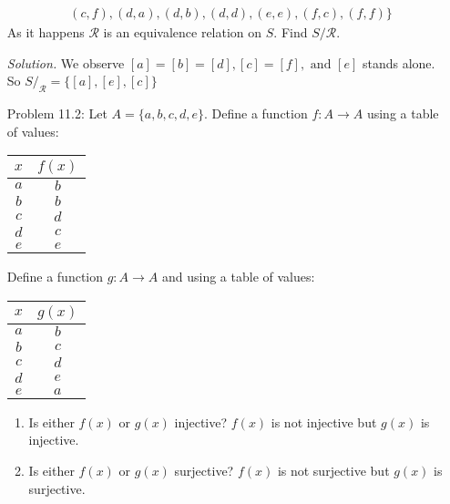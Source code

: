 \documentclass{article}
\theoremstyle{claim}
\theoremstyle{definition}
\begin{document}
\begin{enumerate}
\begin{align*}
            & (c, f), (d, a), (d, b), (d, d), (e, e), (f, c), (f, f) \}
        \end{align*}
        As it happens $\mathcal{R}$ is an equivalence relation on $S$. Find $S/\mathcal{R}$.
    \item[] \emph{Solution. } We observe $[a] = [b] = [d], [c] = [f], \text{ and } [e]$ stands alone. So $S/_{\mathcal{R}} = \{[a], [e], [c]\}$
    \item[Problem 11.2:] Let $A = \{ a, b, c, d, e \}$. Define a function $f: A \rightarrow A$ using a table of values:
        \begin{center}
            \begin{tabular}{ |c | c| }
                \hline
                $x$ & $f(x)$\\
                \hline\hline
                $a$ & $b$\\
                \hline
                $b$ & $b$\\
                \hline
                $c$ & $d$\\
                \hline
                $d$ & $c$\\
                \hline
                $e$ & $e$\\ 
                \hline
            \end{tabular}
        \end{center}
        Define a function $g: A \rightarrow A$ and using a table of values:
        \begin{center}
            \begin{tabular}{ |c | c| }
                \hline
                $x$ & $g(x)$\\
                \hline\hline
                $a$ & $b$\\
                \hline
                $b$ & $c$\\
                \hline
                $c$ & $d$\\
                \hline
                $d$ & $e$\\
                \hline
                $e$ & $a$\\ 
                \hline
            \end{tabular}
        \end{center}
        \begin{enumerate}
            \item Is either $f(x)$ or $g(x)$ injective? $f(x)$ is not injective but $g(x)$ is injective.
            \item Is either $f(x)$ or $g(x)$ surjective? $f(x)$ is not surjective but $g(x)$ is surjective.

\end{enumerate}
\end{enumerate}
\end{document}
